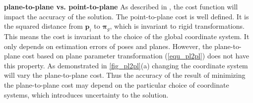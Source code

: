 \documentclass{vgtc}                          %
\begin{document}
\textbf{plane-to-plane vs. point-to-plane} \quad As described in \cite{hartley2003multiple}, the cost function will impact  the accuracy of the solution. %
The point-to-plane cost   is well defined. It is the squared distance from $\mathbf{p}_i $ to $\bm{\pi}_g$, which   is invariant to rigid transformations. This means the cost  is invariant to the choice of  the global coordinate system. It only depends on  estimation errors of poses and planes.  However, the plane-to-plane cost based on plane parameter transformation (\ref{equ_pl2pl}) does not have this property. %
As demonstrated in \autoref{fig_pl2pl}(a) changing the  coordinate system will vary the plane-to-plane cost. Thus  the accuracy of the result of minimizing the plane-to-plane cost may depend on  the particular choice of  coordinate systems, which introduces uncertainty to the solution. %
\end{document}
